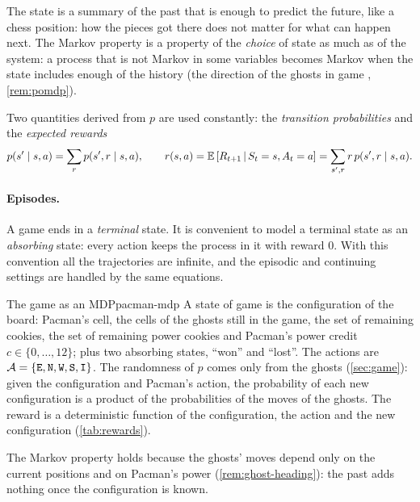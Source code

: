 \begin{intuition}
  The state is a summary of the past that is enough to predict the future,
  like a chess position: how the pieces got there does not matter for what
  can happen next. The Markov property is a property of the \emph{choice} of
  state as much as of the system: a process that is not Markov in some
  variables becomes Markov when the state includes enough of the history
  (the direction of the ghosts in game , \cref{rem:pomdp}).
\end{intuition}

Two quantities derived from $p$ are used constantly: the \emph{transition
probabilities} and the \emph{expected rewards}
\begin{equation}
  p(s' \mid s, a) = \sum_{r} p(s', r \mid s, a), \qquad
  r(s, a) = \mathbb{E}\left[R_{t+1} \,\middle|\, S_t = s, A_t = a\right]
  = \sum_{s', r} r\, p(s', r \mid s, a).
\end{equation}

\paragraph{Episodes.} A game ends in a \emph{terminal} state. It is
convenient to model a terminal state as an \emph{absorbing} state: every
action keeps the process in it with reward $0$. With this convention all
the trajectories are infinite, and the episodic and continuing settings are
handled by the same equations.

\begin{pacman}{The game as an MDP}{pacman-mdp}
  A state of game  is the configuration of the board: Pacman's
  cell, the cells of the ghosts still in the game, the set of remaining
  cookies, the set of remaining power cookies and Pacman's power credit
  $c \in \{0, \dots, 12\}$; plus two absorbing states, ``won'' and
  ``lost''. The actions are $\mathcal{A} = \{\texttt{E}, \texttt{N}, \texttt{W},
  \texttt{S}, \texttt{I}\}$. The randomness of $p$ comes only from the ghosts
  (\cref{sec:game}): given the configuration and Pacman's action, the
  probability of each new configuration is a product of the probabilities
  of the moves of the ghosts. The reward is a deterministic function of the
  configuration, the action and the new configuration
  (\cref{tab:rewards}).

  The Markov property holds because the ghosts' moves depend only on the
  current positions and on Pacman's power (\cref{rem:ghost-heading}): the
  past adds nothing once the configuration is known.
\end{pacman}

